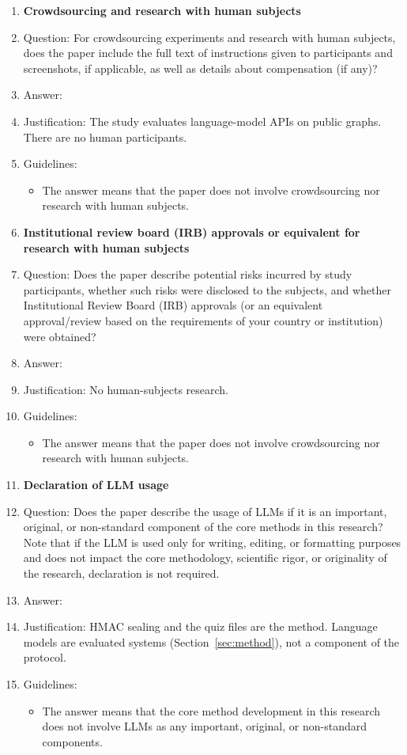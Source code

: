 \begin{enumerate}
\item {\bf Crowdsourcing and research with human subjects}
\item[] Question: For crowdsourcing experiments and research with human subjects, does the paper include the full text of instructions given to participants and screenshots, if applicable, as well as details about compensation (if any)?
\item[] Answer: \answerNA{}
\item[] Justification: The study evaluates language-model APIs on public graphs. There are no human participants.
\item[] Guidelines:
\begin{itemize}
\item The answer \answerNA{} means that the paper does not involve crowdsourcing nor research with human subjects.
\end{itemize}

\item {\bf Institutional review board (IRB) approvals or equivalent for research with human subjects}
\item[] Question: Does the paper describe potential risks incurred by study participants, whether such risks were disclosed to the subjects, and whether Institutional Review Board (IRB) approvals (or an equivalent approval/review based on the requirements of your country or institution) were obtained?
\item[] Answer: \answerNA{}
\item[] Justification: No human-subjects research.
\item[] Guidelines:
\begin{itemize}
\item The answer \answerNA{} means that the paper does not involve crowdsourcing nor research with human subjects.
\end{itemize}

\item {\bf Declaration of LLM usage}
\item[] Question: Does the paper describe the usage of LLMs if it is an important, original, or non-standard component of the core methods in this research? Note that if the LLM is used only for writing, editing, or formatting purposes and does not impact the core methodology, scientific rigor, or originality of the research, declaration is not required.
\item[] Answer: \answerNA{}
\item[] Justification: HMAC sealing and the quiz files are the method. Language models are evaluated systems (Section~\ref{sec:method}), not a component of the protocol.
\item[] Guidelines:
\begin{itemize}
\item The answer \answerNA{} means that the core method development in this research does not involve LLMs as any important, original, or non-standard components.
\end{itemize}

\end{enumerate}
